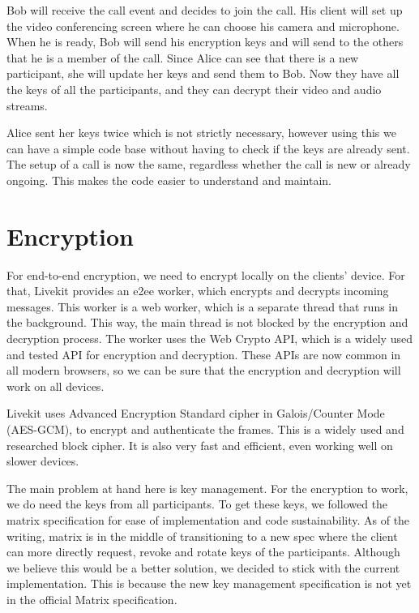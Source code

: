 \documentclass{report}
\begin{document}
Bob will receive the call event and decides to join the call. His client will set up the video conferencing
screen where he can choose his camera and microphone. When he is ready, Bob will send his encryption keys and will
send to the others that he is a member of the call. Since Alice can see that there is a new participant, she will
update her keys and send them to Bob. Now they have all the keys of all the participants, and they can decrypt their
video and audio streams.

Alice sent her keys twice which is not strictly necessary, however using this we can have a simple code base
without having to check if the keys are already sent. The setup of a call is now the same, regardless whether
the call is new or already ongoing. This makes the code easier to understand and maintain.

\section{Encryption}
For end-to-end encryption, we need to encrypt locally on the clients' device. For that, Livekit provides an e2ee worker,
which encrypts and decrypts incoming messages. This worker is a web worker, which is a separate
thread that runs in the background. This way, the main thread is not blocked by the encryption and decryption
process. The worker uses the Web Crypto API, which is a widely used and tested API for encryption and decryption.
These APIs are now common in all modern browsers, so we can be sure that the encryption and decryption will work on
all devices.

Livekit uses Advanced Encryption Standard cipher in Galois/Counter Mode (AES-GCM)\cite{daemen_rijndael_nodate}\cite{
mcgrew_galoiscounter_nodate}, to encrypt and authenticate the frames. This is a widely used and researched block
cipher. It is also very fast and efficient, even working well on slower devices.

The main problem at hand here is key management. For the encryption to work, we do need the keys from all
participants. To get these keys, we followed the matrix specification for ease of implementation and code
sustainability. As of the writing, matrix is in the middle of transitioning to a new spec where the client can more
directly request, revoke and rotate keys of the participants. Although we believe this would be a better solution, we
decided to stick with the current implementation. This is because the new key management specification is not yet in
the official Matrix specification.
\end{document}
